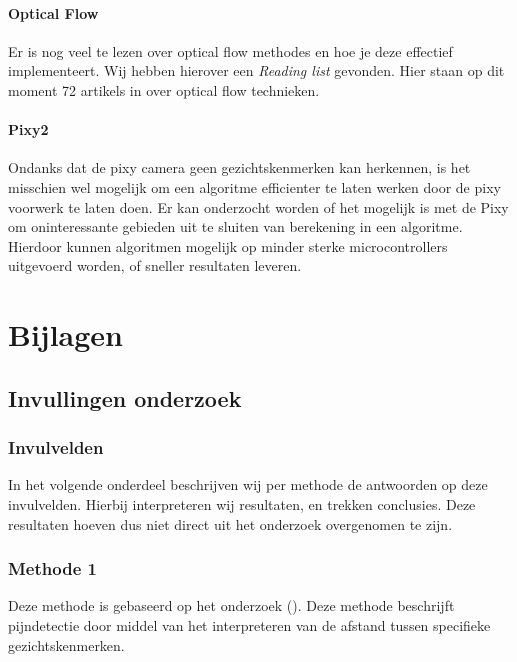 \documentclass[11pt]{article}
\begin{document}
    \paragraph{Optical Flow} Er is nog veel te lezen over optical flow methodes en hoe je deze effectief implementeert.
    Wij hebben hierover een \emph{\citet{Readinglist} Reading list} gevonden.
    Hier staan op dit moment 72 artikels in over optical flow technieken.

    \paragraph{Pixy2} Ondanks dat de pixy camera geen gezichtskenmerken kan herkennen, is het misschien wel mogelijk om een algoritme efficienter te laten werken door de pixy voorwerk te laten doen.
    Er kan onderzocht worden of het mogelijk is met de Pixy om oninteressante gebieden uit te sluiten van berekening in een algoritme.
    Hierdoor kunnen algoritmen mogelijk op minder sterke microcontrollers uitgevoerd worden, of sneller resultaten leveren.




    \section{Bijlagen}\label{sec:bijlagen}

    \subsection{Invullingen onderzoek}\label{subsec:invullingen-onderzoek}

    \subsubsection{Invulvelden}
    In het volgende onderdeel beschrijven wij per methode de antwoorden op deze invulvelden.
    Hierbij interpreteren wij resultaten, en trekken conclusies.
    Deze resultaten hoeven dus niet direct uit het onderzoek overgenomen te zijn.

    \subsubsection{Methode 1}
    Deze methode is gebaseerd op het onderzoek (\citet{werner2014automatic}).
    Deze methode beschrijft pijndetectie door middel van het interpreteren van de afstand tussen specifieke gezichtskenmerken.
\end{document}
